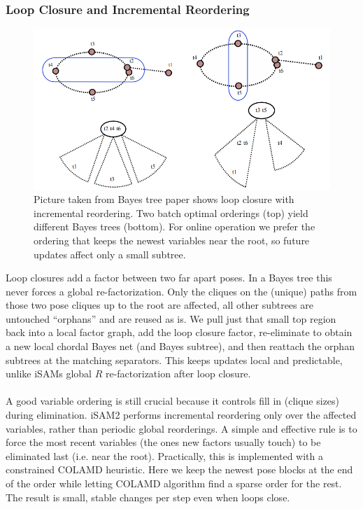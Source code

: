 \subsubsection{Loop Closure and Incremental Reordering}
\begin{figure}[H]
    \centering
    \includegraphics[width=0.98\linewidth]{Pictures/Optimizers/iSAM2/incremental_reordering.png}
    \caption{Picture taken from Bayes tree paper \cite{Bayes_tree_for_SLAM_paper} shows loop closure with incremental reordering. Two batch optimal orderings (top) yield different Bayes trees (bottom). For online operation we prefer the ordering that keeps the newest variables near the root, so future updates affect only a small subtree.}
    \label{fig:optimizer-iSAM2-incremental-reordering}
\end{figure}
\noindent
Loop closures add a factor between two far apart poses. In a Bayes tree this never forces a global re-factorization. Only the cliques on the (unique) paths from those two pose cliques up to the root are affected, all other subtrees are untouched ``orphans'' and are reused as is. We pull just that small top region back into a local factor graph, add the loop closure factor, re-eliminate to obtain a new local chordal Bayes net (and Bayes subtree), and then reattach the orphan subtrees at the matching separators. This keeps updates local and predictable, unlike iSAMs global $R$ re-factorization after loop closure. \cite{iSAM2_paper,Bayes_tree_for_SLAM_paper}
\\ \\
A good variable ordering is still crucial because it controls fill in (clique sizes) during elimination. iSAM2 performs incremental reordering only over the affected variables, rather than periodic global reorderings. A simple and effective rule is to force the most recent variables (the ones new factors usually touch) to be eliminated last (i.e. near the root). Practically, this is implemented with a constrained COLAMD heuristic. Here we keep the newest pose blocks at the end of the order while letting COLAMD algorithm find a sparse order for the rest. The result is small, stable changes per step even when loops close. \cite{Bayes_tree_for_SLAM_paper}
